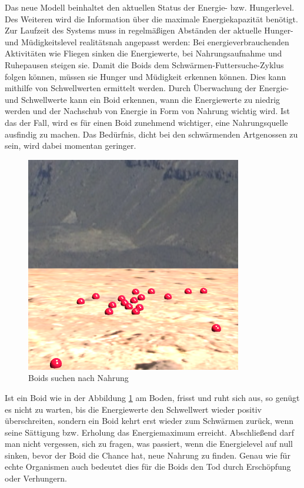 \documentclass[draft=false
              ,paper=a4
              ,twoside=false
              ,fontsize=11pt
              ,headsepline
              ,BCOR10mm
              ,DIV11
              ,bibtotoc
              ,liststotoc
              ]{scrbook}
\begin{document}
Das neue Modell beinhaltet den aktuellen Status der Energie- bzw. Hungerlevel. Des Weiteren wird die Information über die maximale Energiekapazität benötigt. Zur Laufzeit des Systems muss in regelmäßigen Abständen der aktuelle Hunger- und Müdigkeitslevel realitätsnah angepasst werden: Bei energieverbrauchenden Aktivitäten wie Fliegen sinken die Energiewerte, bei Nahrungsaufnahme und Ruhepausen steigen sie. Damit die Boids dem Schwärmen-Futtersuche-Zyklus folgen können, müssen sie Hunger und Müdigkeit erkennen können. Dies kann mithilfe von Schwellwerten ermittelt werden. Durch Überwachung der Energie- und Schwellwerte kann ein Boid erkennen, wann die Energiewerte zu niedrig werden und der Nachschub von Energie in Form von Nahrung wichtig wird. Ist das der Fall, wird es für einen Boid zunehmend wichtiger, eine Nahrungsquelle ausfindig zu machen. Das Bedürfnis, dicht bei den schwärmenden Artgenossen zu sein, wird dabei momentan geringer.


\begin{figure}[htp]
\centering
\includegraphics[scale=0.50]{project/ground.png}
\caption{Boids suchen nach Nahrung}
\label{onground}
\end{figure}

Ist ein Boid wie in der Abbildung \ref{onground} am Boden, frisst und ruht sich aus, so genügt es nicht zu warten, bis die Energiewerte den Schwellwert wieder positiv überschreiten, sondern ein Boid kehrt erst wieder zum Schwärmen zurück, wenn seine Sättigung bzw. Erholung das Energiemaximum erreicht.
Abschließend darf man nicht vergessen, sich zu fragen, was passiert, wenn die Energielevel auf null sinken, bevor der Boid die Chance hat, neue Nahrung zu finden. Genau wie für echte Organismen auch bedeutet dies für die Boids den Tod durch Erschöpfung oder Verhungern.
\end{document}
